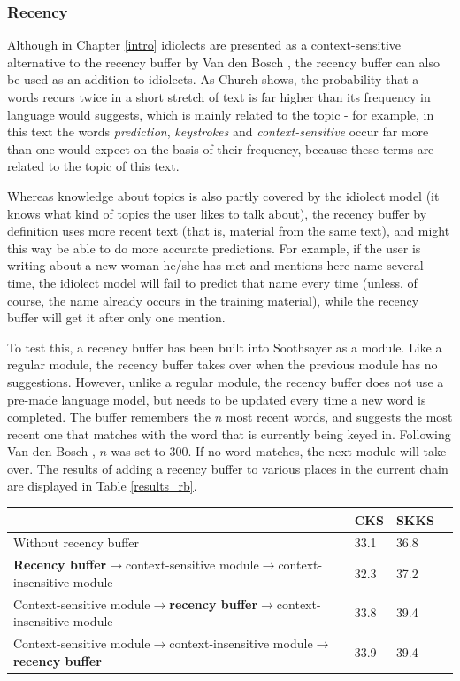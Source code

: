 \documentclass[11pt]{article}
\let\originaltable\table
\let\endoriginaltable\endtable
\renewenvironment{table}[1][ht]{%
  \originaltable[#1]
  \centering}%
  {\endoriginaltable}
\begin{document}
\subsubsection{Recency} \label{rb}

Although in Chapter \ref{intro} idiolects are presented as a context-sensitive alternative to the recency buffer by Van den Bosch , the recency buffer can also be used as an addition to idiolects. As Church  shows, the probability that a words recurs twice in a short stretch of text is far higher than its  frequency in language would suggests, which is mainly related to the topic - for example, in this text the words \emph{prediction}, \emph{keystrokes} and \emph{context-sensitive}  occur far more than one would expect on the basis of their frequency, because these terms are related to the topic of this text. 

Whereas knowledge about topics is also partly covered by the idiolect model (it knows what kind of topics the user likes to talk about), the recency buffer by definition uses more recent text (that is, material from the same text), and might this way be able to do more accurate predictions. For example, if the user is writing about a new woman he/she has met and mentions here name several time, the idiolect model will fail to predict that name every time (unless, of course, the name already occurs in the training material), while the recency buffer will get it after only one mention.

To test this, a recency buffer has been built into Soothsayer as a module. Like a regular module, the recency buffer takes over when the previous module has no suggestions. However, unlike a regular module, the recency buffer does not use a pre-made language model, but needs to be updated every time a new word is completed. The buffer remembers the $n$ most recent words, and suggests the most recent one that matches with the word that is currently being keyed in. Following Van den Bosch , $n$ was set to 300. If no word matches, the next module will take over. The results of adding a recency buffer to various places in the current chain are displayed in Table \ref{results_rb}.

\begin{table}[h]
\begin{tabular}{l|lll} 

&CKS&SKKS\\
\hline
Without recency buffer&33.1&36.8\\
\textbf{Recency buffer}$\rightarrow$context-sensitive module$\rightarrow$context-insensitive module&32.3&37.2\\
Context-sensitive module$\rightarrow$\textbf{recency buffer}$\rightarrow$context-insensitive module&33.8&39.4\\
Context-sensitive module$\rightarrow$context-insensitive module$\rightarrow$\textbf{recency buffer}&33.9&39.4\\
\end{tabular} 
\caption{Percentage of keystrokes saved with and without a recency buffer.} \label{results_rb}
\end{table}
\end{document}
